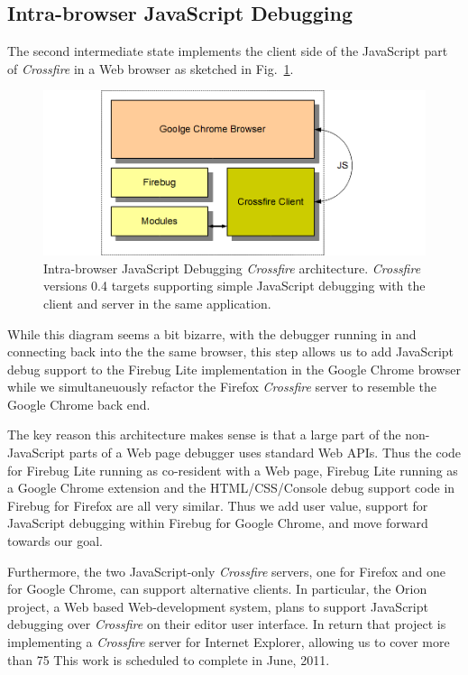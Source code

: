 \subsection{Intra-browser JavaScript Debugging}
The second intermediate state implements the client side of the JavaScript part of \textit{Crossfire} in
a Web browser as sketched in Fig.~\ref{fig:fbugChrome}.
\begin{figure}[htp]
  \includegraphics  [width = 86 mm] {figures/fbugChrome.png}
  \caption{Intra-browser JavaScript Debugging \textit{Crossfire} architecture.
\textit{Crossfire} versions 0.4 targets supporting simple JavaScript debugging with the client and server in the same application.}
 \label{fig:fbugChrome}
\end{figure}
While this diagram seems a bit bizarre, with the
debugger running in and connecting back into the the same browser, this step allows us to add JavaScript debug
support to the Firebug Lite implementation in the Google Chrome browser while we simultaneuously refactor
the Firefox  \textit{Crossfire} server to resemble the Google Chrome back end.

The key reason this architecture makes sense is that a large part of the non-JavaScript parts of a Web page
debugger uses standard Web APIs. Thus the code for Firebug Lite running as co-resident with a Web page,
Firebug Lite running as a Google Chrome extension and the HTML/CSS/Console debug support code in Firebug
for Firefox are all very similar.   Thus we add user value, support for JavaScript debugging within Firebug for Google Chrome,
and move forward towards our goal.

Furthermore, the two JavaScript-only \textit{Crossfire} servers, one for Firefox and one for Google Chrome, can support
alternative clients. In particular, the Orion project, a Web based Web-development system, plans to support
JavaScript debugging over \textit{Crossfire} on their editor user interface. In return that project is implementing a \textit{Crossfire}
server for Internet Explorer, allowing us to cover more than 75%
This work is scheduled to complete in June, 2011.

